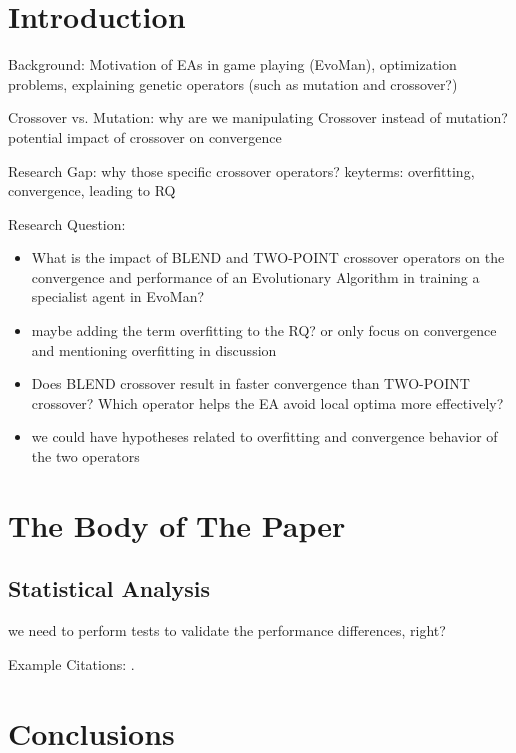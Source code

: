 \section{Introduction}
Background: Motivation of EAs in game playing (EvoMan), optimization problems, explaining genetic operators (such as mutation and crossover?)

Crossover vs. Mutation: why are we manipulating Crossover instead of mutation? potential impact of crossover on convergence

Research Gap: why those specific crossover operators? keyterms: overfitting, convergence, leading to RQ

Research Question:
\begin{itemize}
 	\item What is the impact of BLEND and TWO-POINT crossover operators on the convergence and performance of an Evolutionary Algorithm in training a specialist agent in EvoMan?
 	\item maybe adding the term overfitting to the RQ? or only focus on convergence and mentioning overfitting in discussion
	\item Does BLEND crossover result in faster convergence than TWO-POINT crossover? Which operator helps the EA avoid local optima more effectively?
	\item we could have hypotheses related to overfitting and convergence behavior of the two operators
\end{itemize}

\section{The Body of The Paper}
\subsection*{Statistical Analysis}
we need to perform tests to validate the performance differences, right?


Example Citations: \cite{TUGInstmem, Thornburg01, CTANacmart}.

\section{Conclusions}

